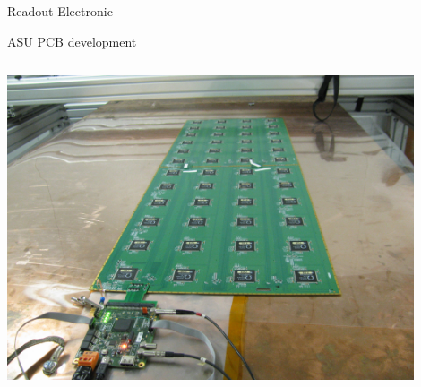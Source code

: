 \documentclass[10pt]{beamer}
\begin{document}
\begin{frame}[shrink=3]{Readout Electronic}
\begin{block}{ASU PCB development}
\begin{columns}
      \begin{column}{0.5\textwidth}
        \centerline{\includegraphics[width=0.9\textwidth]{jpg/DIFAsu}}
      \end{column}

    \end{columns}
  \end{block}
\end{frame}
\end{document}
